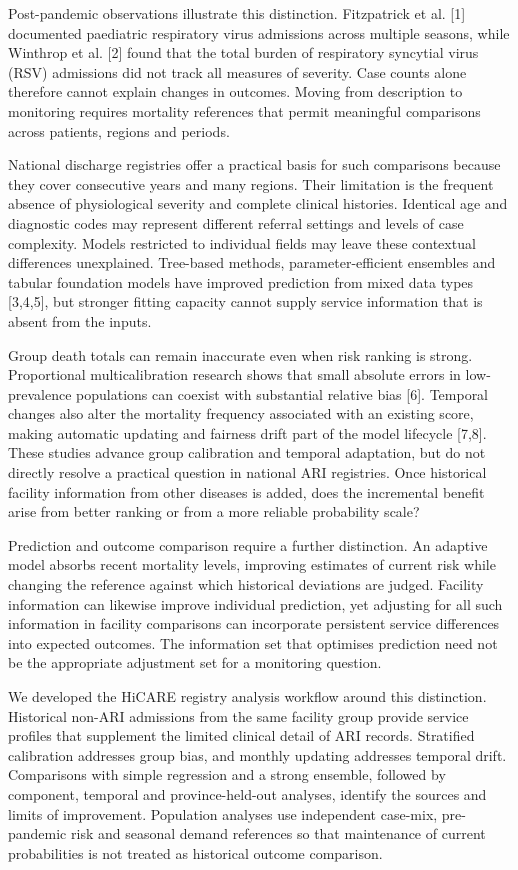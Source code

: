 \documentclass[11pt,a4paper]{article}
\begin{document}
Post-pandemic observations illustrate this distinction. Fitzpatrick et al. [1] documented paediatric respiratory virus admissions across multiple seasons, while Winthrop et al. [2] found that the total burden of respiratory syncytial virus (RSV) admissions did not track all measures of severity. Case counts alone therefore cannot explain changes in outcomes. Moving from description to monitoring requires mortality references that permit meaningful comparisons across patients, regions and periods.

\clearpage
National discharge registries offer a practical basis for such comparisons because they cover consecutive years and many regions. Their limitation is the frequent absence of physiological severity and complete clinical histories. Identical age and diagnostic codes may represent different referral settings and levels of case complexity. Models restricted to individual fields may leave these contextual differences unexplained. Tree-based methods, parameter-efficient ensembles and tabular foundation models have improved prediction from mixed data types [3,4,5], but stronger fitting capacity cannot supply service information that is absent from the inputs.

Group death totals can remain inaccurate even when risk ranking is strong. Proportional multicalibration research shows that small absolute errors in low-prevalence populations can coexist with substantial relative bias [6]. Temporal changes also alter the mortality frequency associated with an existing score, making automatic updating and fairness drift part of the model lifecycle [7,8]. These studies advance group calibration and temporal adaptation, but do not directly resolve a practical question in national ARI registries. Once historical facility information from other diseases is added, does the incremental benefit arise from better ranking or from a more reliable probability scale?

Prediction and outcome comparison require a further distinction. An adaptive model absorbs recent mortality levels, improving estimates of current risk while changing the reference against which historical deviations are judged. Facility information can likewise improve individual prediction, yet adjusting for all such information in facility comparisons can incorporate persistent service differences into expected outcomes. The information set that optimises prediction need not be the appropriate adjustment set for a monitoring question.

We developed the HiCARE registry analysis workflow around this distinction. Historical non-ARI admissions from the same facility group provide service profiles that supplement the limited clinical detail of ARI records. Stratified calibration addresses group bias, and monthly updating addresses temporal drift. Comparisons with simple regression and a strong ensemble, followed by component, temporal and province-held-out analyses, identify the sources and limits of improvement. Population analyses use independent case-mix, pre-pandemic risk and seasonal demand references so that maintenance of current probabilities is not treated as historical outcome comparison.
\end{document}
